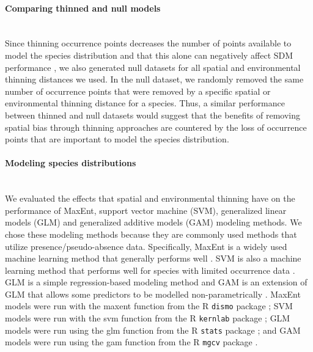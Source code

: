 \paragraph*{Comparing thinned and null models}\mbox{}\\ 
Since thinning occurrence points decreases the number of points available to model the species distribution and that this alone can negatively affect SDM performance \parencite{loiselle2008,tessarolo2014}, we also generated null datasets for all spatial and environmental thinning distances we used. In the null dataset, we randomly removed the same number of occurrence points that were removed by a specific spatial or environmental thinning distance for a species. Thus, a similar performance between thinned and null datasets would suggest that the benefits of removing spatial bias through thinning approaches are countered by the loss of occurrence points that are important to model the species distribution.

\paragraph*{Modeling species distributions}\mbox{}\\ 
We evaluated the effects that spatial and environmental thinning have on the performance of MaxEnt, support vector machine (SVM), generalized linear models (GLM) and generalized additive models (GAM) modeling methods. We chose these modeling methods because they are commonly used methods that utilize presence/pseudo-absence data. Specifically, MaxEnt is a widely used machine learning method that generally performs well \parencite{elith2010,santini2020}. SVM is also a machine learning method that performs well for species with limited occurrence data \parencite{scholkopf2001, tax2004, drake2006}. GLM is a simple regression-based modeling method \parencite{nelder1972, loyola2012} and GAM is an extension of GLM that allows some predictors to be modelled non-parametrically \parencite{guisan2002}. MaxEnt models were run with the maxent function from the R \texttt{dismo} package \parencite{hijmans2017}; SVM models were run with the svm function from the R \texttt{kernlab} package \parencite{karatzoglou2019}; GLM models were run using the glm function from the R \texttt{stats} package \parencite{R}; and GAM models were run using the gam function from the R \texttt{mgcv} package \parencite{wood2017}.

